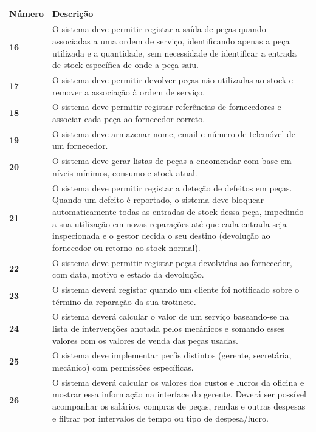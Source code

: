 \documentclass[11pt,a4paper]{article}
\begin{document}
	\begin{tabularx}{\textwidth}{@{}|l|X|@{}}
		\hline
		\rowcolor{gray!10} \textbf{Número} & \textbf{Descrição} \\ \hline
		\textbf{16}  & O sistema deve permitir registar a saída de peças quando associadas a uma ordem de serviço, identificando apenas a peça utilizada e a quantidade, sem necessidade de identificar a entrada de stock específica de onde a peça saiu. \\ \hline
		\textbf{17}  & O sistema deve permitir devolver peças não utilizadas ao stock e remover a associação à ordem de serviço. \\ \hline
		\textbf{18}  & O sistema deve permitir registar referências de fornecedores e associar cada peça ao fornecedor correto. \\ \hline
		\textbf{19}  & O sistema deve armazenar nome, email e número de telemóvel de um fornecedor. \\ \hline
		\textbf{20}  & O sistema deve gerar listas de peças a encomendar com base em níveis mínimos, consumo e stock atual. \\ \hline
		\textbf{21}  & O sistema deve permitir registar a deteção de defeitos em peças. Quando um defeito é reportado, o sistema deve bloquear automaticamente todas as entradas de stock dessa peça, impedindo a sua utilização em novas reparações até que cada entrada seja inspecionada e o gestor decida o seu destino (devolução ao fornecedor ou retorno ao stock normal). \\ \hline
		\textbf{22}  & O sistema deve permitir registar peças devolvidas ao fornecedor, com data, motivo e estado da devolução. \\ \hline
		\textbf{23}  & O sistema deverá registar quando um cliente foi notificado sobre o término da reparação da sua trotinete. \\ \hline
		\textbf{24}  & O sistema deverá calcular o valor de um serviço baseando-se na lista de intervenções anotada pelos mecânicos e somando esses valores com os valores de venda das peças usadas. \\ \hline
		\textbf{25}  & O sistema deve implementar perfis distintos (gerente, secretária, mecânico) com permissões específicas. \\ \hline
		\textbf{26} & O sistema deverá calcular os valores dos custos e lucros da oficina e mostrar essa informação na interface do gerente. Deverá ser possível acompanhar os salários, compras de peças, rendas e outras despesas e filtrar por intervalos de tempo ou tipo de despesa/lucro. \\ \hline
	\end{tabularx}
	
\end{document}
